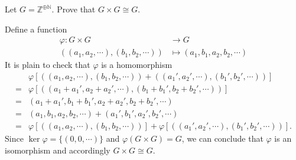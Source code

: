 \documentclass[12pt,letterpaper,boxed]{hmcpset}
\begin{document}
\begin{problem}[5.9]
 Let $G = \mathbb{Z}^{\oplus\mathbb{N}}$. Prove that $G\times G\cong G$.
\end{problem}
\begin{solution}
Define a function
\begin{align*}
\varphi:G\times G&\longrightarrow G\\
((a_1,a_2,\cdots),(b_1,b_2,\cdots))&\longmapsto (a_1,b_1,a_2,b_2,\cdots)
\end{align*}
It is plain to check that $\varphi$ is a homomorphism
\begin{align*}
&\varphi[((a_1,a_2,\cdots),(b_1,b_2,\cdots))+((a_1',a_2',\cdots),(b_1',b_2',\cdots))]\\
=&\varphi[((a_1+a_1',a_2+a_2',\cdots),(b_1+b_1',b_2+b_2',\cdots))]\\
=&(a_1+a_1',b_1+b_1',a_2+a_2',b_2+b_2',\cdots)\\
=&(a_1,b_1,a_2,b_2,\cdots)+(a_1',b_1',a_2',b_2',\cdots)\\
=&\varphi[((a_1,a_2,\cdots),(b_1,b_2,\cdots))]+\varphi[((a_1',a_2',\cdots),(b_1',b_2',\cdots))].
\end{align*}
Since $\ker\varphi=\{(0,0,\cdots)\}$ and $\varphi(G\times G)=G$, we can conclude that $\varphi$ is an isomorphism and accordingly $G\times G\cong G$.
\end{solution}
\end{document}
